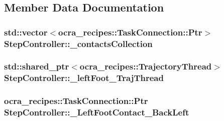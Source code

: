 \subsection{\-Member \-Data \-Documentation}
\hypertarget{classStepController_aabeb4837b7b6cf691cb9de57c6ea8800}{
\subsubsection[{\-\_\-contacts\-Collection}]{\setlength{\rightskip}{0pt plus 5cm}std\-::vector$<$ocra\-\_\-recipes\-::\-Task\-Connection\-::\-Ptr$>$ {\bf \-Step\-Controller\-::\-\_\-contacts\-Collection}}}\label{classStepController_aabeb4837b7b6cf691cb9de57c6ea8800}
\hypertarget{classStepController_adc2b0bf2d3c302c54d659d44cb34ba3e}{
\subsubsection[{\-\_\-left\-Foot\-\_\-\-Traj\-Thread}]{\setlength{\rightskip}{0pt plus 5cm}std\-::shared\-\_\-ptr$<$ocra\-\_\-recipes\-::\-Trajectory\-Thread$>$ {\bf \-Step\-Controller\-::\-\_\-left\-Foot\-\_\-\-Traj\-Thread}}}\label{classStepController_adc2b0bf2d3c302c54d659d44cb34ba3e}
\hypertarget{classStepController_ad778378c6e6ac12d972cc8c5a986dcf9}{
\subsubsection[{\-\_\-\-Left\-Foot\-Contact\-\_\-\-Back\-Left}]{\setlength{\rightskip}{0pt plus 5cm}ocra\-\_\-recipes\-::\-Task\-Connection\-::\-Ptr {\bf \-Step\-Controller\-::\-\_\-\-Left\-Foot\-Contact\-\_\-\-Back\-Left}}}\label{classStepController_ad778378c6e6ac12d972cc8c5a986dcf9}
